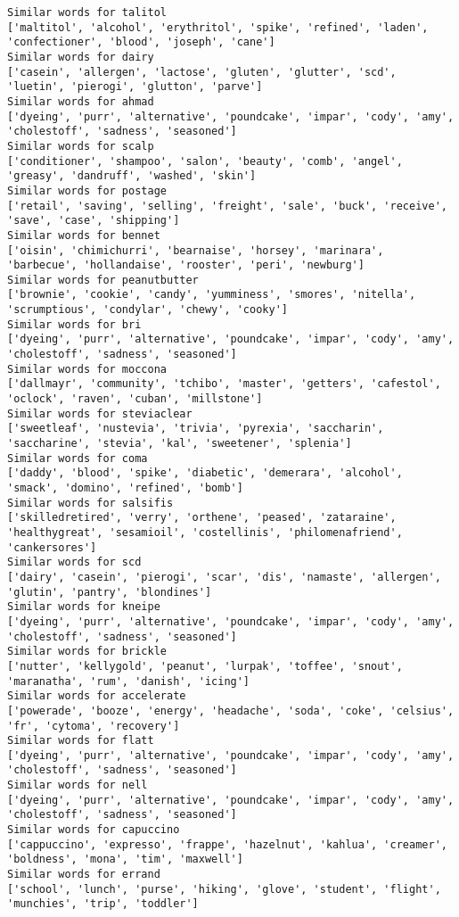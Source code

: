 \documentclass[11pt]{article}
\begin{document}
\begin{Verbatim}[commandchars=\\\{\}]
Similar words for talitol
['maltitol', 'alcohol', 'erythritol', 'spike', 'refined', 'laden', 'confectioner', 'blood', 'joseph', 'cane']
Similar words for dairy
['casein', 'allergen', 'lactose', 'gluten', 'glutter', 'scd', 'luetin', 'pierogi', 'glutton', 'parve']
Similar words for ahmad
['dyeing', 'purr', 'alternative', 'poundcake', 'impar', 'cody', 'amy', 'cholestoff', 'sadness', 'seasoned']
Similar words for scalp
['conditioner', 'shampoo', 'salon', 'beauty', 'comb', 'angel', 'greasy', 'dandruff', 'washed', 'skin']
Similar words for postage
['retail', 'saving', 'selling', 'freight', 'sale', 'buck', 'receive', 'save', 'case', 'shipping']
Similar words for bennet
['oisin', 'chimichurri', 'bearnaise', 'horsey', 'marinara', 'barbecue', 'hollandaise', 'rooster', 'peri', 'newburg']
Similar words for peanutbutter
['brownie', 'cookie', 'candy', 'yumminess', 'smores', 'nitella', 'scrumptious', 'condylar', 'chewy', 'cooky']
Similar words for bri
['dyeing', 'purr', 'alternative', 'poundcake', 'impar', 'cody', 'amy', 'cholestoff', 'sadness', 'seasoned']
Similar words for moccona
['dallmayr', 'community', 'tchibo', 'master', 'getters', 'cafestol', 'oclock', 'raven', 'cuban', 'millstone']
Similar words for steviaclear
['sweetleaf', 'nustevia', 'trivia', 'pyrexia', 'saccharin', 'saccharine', 'stevia', 'kal', 'sweetener', 'splenia']
Similar words for coma
['daddy', 'blood', 'spike', 'diabetic', 'demerara', 'alcohol', 'smack', 'domino', 'refined', 'bomb']
Similar words for salsifis
['skilledretired', 'verry', 'orthene', 'peased', 'zataraine', 'healthygreat', 'sesamioil', 'costellinis', 'philomenafriend', 'cankersores']
Similar words for scd
['dairy', 'casein', 'pierogi', 'scar', 'dis', 'namaste', 'allergen', 'glutin', 'pantry', 'blondines']
Similar words for kneipe
['dyeing', 'purr', 'alternative', 'poundcake', 'impar', 'cody', 'amy', 'cholestoff', 'sadness', 'seasoned']
Similar words for brickle
['nutter', 'kellygold', 'peanut', 'lurpak', 'toffee', 'snout', 'maranatha', 'rum', 'danish', 'icing']
Similar words for accelerate
['powerade', 'booze', 'energy', 'headache', 'soda', 'coke', 'celsius', 'fr', 'cytoma', 'recovery']
Similar words for flatt
['dyeing', 'purr', 'alternative', 'poundcake', 'impar', 'cody', 'amy', 'cholestoff', 'sadness', 'seasoned']
Similar words for nell
['dyeing', 'purr', 'alternative', 'poundcake', 'impar', 'cody', 'amy', 'cholestoff', 'sadness', 'seasoned']
Similar words for capuccino
['cappuccino', 'expresso', 'frappe', 'hazelnut', 'kahlua', 'creamer', 'boldness', 'mona', 'tim', 'maxwell']
Similar words for errand
['school', 'lunch', 'purse', 'hiking', 'glove', 'student', 'flight', 'munchies', 'trip', 'toddler']

\end{Verbatim}
\end{document}
